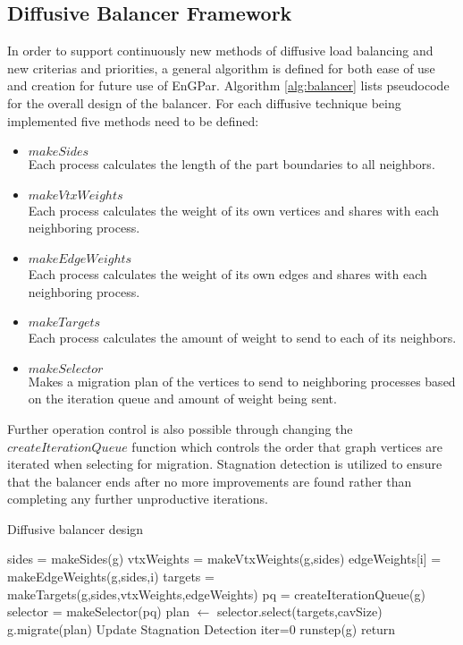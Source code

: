 \documentclass[a4paper]{article}
\begin{document}
\subsection{Diffusive Balancer Framework}
In order to support continuously new methods of diffusive load balancing and new criterias and priorities, a general algorithm is defined for both ease of use and creation for future use of EnGPar. Algorithm \ref{alg:balancer} lists pseudocode for the overall design of the balancer. For each diffusive technique being implemented five methods need to be defined:
\begin{itemize}
  \item $makeSides$\\
    Each process calculates the length of the part boundaries to all neighbors.
  \item $makeVtxWeights$ \\
    Each process calculates the weight of its own vertices and shares with each neighboring process.
  \item $makeEdgeWeights$ \\
    Each process calculates the weight of its own edges and shares with each neighboring process.
  \item $makeTargets$\\
    Each process calculates the amount of weight to send to each of its neighbors.
  \item $makeSelector$\\
    Makes a migration plan of the vertices to send to neighboring processes based on the iteration queue and amount of weight being sent.
\end{itemize}
Further operation control is also possible through changing the $createIterationQueue$ function which controls the order that graph vertices are iterated when selecting for migration. Stagnation detection is utilized to ensure that the balancer ends after no more improvements are found rather than completing any further unproductive iterations.

\begin{algorithm}
\caption{Diffusive balancer design}\label{alg:balancer}
\begin{algorithmic}
  \label{alg:balancer}
  \State sides = makeSides(g)
  \State vtxWeights = makeVtxWeights(g,sides)
  \State edgeWeights[i] = makeEdgeWeights(g,sides,i)
  \EndFor
  \State targets = makeTargets(g,sides,vtxWeights,edgeWeights)
  \State pq = createIterationQueue(g)
  \State selector = makeSelector(pq)
  \State plan $\leftarrow$ selector.select(targets,cavSize)
  \EndFor
  \State g.migrate(plan)
  \State Update Stagnation Detection
  \EndProcedure
  \State iter=0
  \State runstep(g)
  \State return
  \EndIf
  \EndFor
  \EndProcedure
\end{algorithmic}
\end{algorithm}
\end{document}
